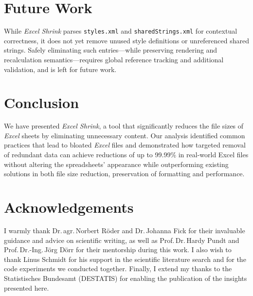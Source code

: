 \documentclass[conference]{IEEEtran}
\begin{document}
\section{Future Work}
While \textit{Excel Shrink} parses \texttt{styles.xml} and
\texttt{sharedStrings.xml} for contextual correctness,
it does not yet remove unused style definitions or unreferenced shared strings.
Safely eliminating such entries—while preserving rendering and recalculation
semantics—requires global reference tracking and additional validation,
and is left for future work.


\section{Conclusion}
\label{sec:conclusion}

We have presented \textit{Excel Shrink}, a tool that significantly reduces the file sizes of \textit{Excel} sheets by eliminating unnecessary content. Our analysis identified common practices that lead to bloated \textit{Excel} files and demonstrated how targeted removal of redundant data can achieve reductions of up to 99.99\% in real-world Excel files without altering the spreadsheets' appearance while outperforming existing solutions in both file size reduction, preservation of formatting and performance.

\section*{Acknowledgements}

I warmly thank Dr.\,agr.\,Norbert Röder and Dr.\,Johanna Fick for their invaluable guidance and advice on scientific writing, as well as Prof.\,Dr.\,Hardy Pundt and Prof.\,Dr.-Ing.\,Jörg Dörr for their mentorship during this work. I also wish to thank Linus Schmidt for his support in the scientific literature search and for the code experiments we conducted together. Finally, I extend my thanks to the Statistisches Bundesamt (DESTATIS) for enabling the publication of the insights presented here.
\end{document}
